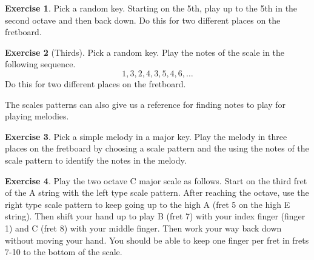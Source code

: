\documentclass[12pt]{article}
\theoremstyle{definition}
\newtheorem{exercise}{Exercise}
\begin{document}
\begin{exercise}
Pick a random key. Starting on the 5th, play up to the 5th in the second octave and then back down. Do this for two different places on the fretboard. 
\end{exercise}

\begin{exercise}[Thirds]
Pick a random key. Play the notes of the scale in the following sequence.
$$ 1, 3, 2, 4, 3, 5, 4, 6, \dots$$
Do this for two different places on the fretboard. 
\end{exercise}

The scales patterns can also give us a reference for finding notes to play for playing melodies. 

\begin{exercise}
Pick a simple melody in a major key. Play the melody in three places on the fretboard by choosing a scale pattern and the using the notes of the scale pattern to identify the notes in the melody. 
\end{exercise}

\begin{exercise}
Play the two octave C major scale as follows. 
Start on the third fret of the A string with the left type scale pattern. 
After reaching the octave, use the right type scale pattern to keep going up to the high A (fret 5 on the high E string). 
Then shift your hand up to play B (fret 7) with your index finger (finger 1) and C (fret 8) with your middle finger. Then work your way back down without moving your hand. You should be able to keep one finger per fret in frets 7-10 to the bottom of the scale. 
\end{exercise}
\end{document}
